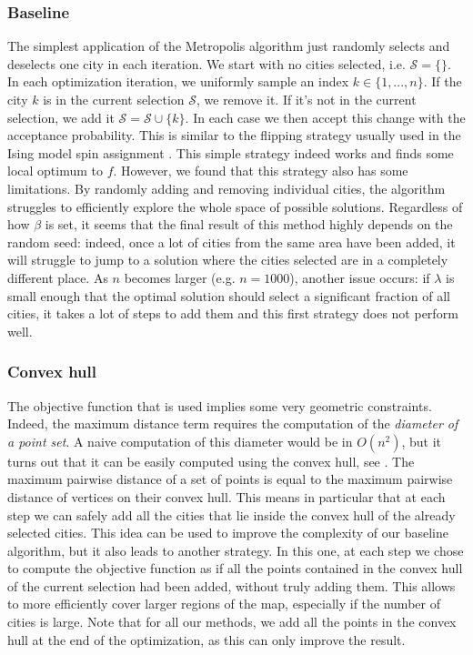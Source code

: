 \documentclass[conference,compsoc]{IEEEtran}
\newcommand{\selected}{\mathcal{S}} \newcommand{\newselected}{\hat{\mathcal{S}}}
\begin{document}
\subsubsection{Baseline}
The simplest application of the Metropolis algorithm just randomly selects and
deselects one city in each iteration. We start with no cities selected, i.e.
$\selected = \lbrace \rbrace$. In each optimization iteration, we uniformly
sample an index $k \in \lbrace 1, ..., n \rbrace$. If the city $k$ is in the
current selection $\selected$, we remove it. If it's not in the current
selection, we add it $\selected = \selected \cup \lbrace k \rbrace$. In each
case we then accept this change with the acceptance probability. This is similar
to the flipping strategy usually used in the Ising model spin assignment
\cite{newman1999monte}. This simple strategy indeed works and finds some local
optimum to $f$. However, we found that this strategy also has some limitations.
By randomly adding and removing individual cities, the algorithm struggles to
efficiently explore the whole space of possible solutions. Regardless of how
$\beta$ is set, it seems that the final result of this method highly depends on
the random seed: indeed, once a lot of cities from the same area have been
added, it will struggle to jump to a solution where the cities selected are in a
completely different place. As $n$ becomes larger (e.g. $n=1000$), another issue
occurs: if $\lambda$ is small enough that the optimal solution should select a
significant fraction of all cities, it takes a lot of steps to add them and this
first strategy does not perform well.

\subsubsection{Convex hull}
The objective function that is used implies some very geometric constraints.
Indeed, the maximum distance term requires the computation of the
\textit{diameter of a point set}. A naive computation of this diameter would be
in $O(n^2)$, but it turns out that it can be easily computed using the convex
hull, see \cite{diameter}. The maximum pairwise distance of a set of points is
equal to the maximum pairwise distance of vertices on their convex hull. This
means in particular that at each step we can safely add all the cities that lie
inside the convex hull of the already selected cities. This idea can be used to
improve the complexity of our baseline algorithm, but it also leads to another
strategy. In this one, at each step we chose to compute the objective function
as if all the points contained in the convex hull of the current selection had
been added, without truly adding them. This allows to more efficiently cover
larger regions of the map, especially if the number of cities is large. Note
that for all our methods, we add all the points in the convex hull at the end of
the optimization, as this can only improve the result.
\end{document}
